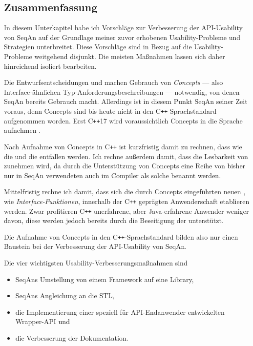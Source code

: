 \subsection{Zusammenfassung}

In diesem Unterkapitel habe ich Vorschläge zur Verbesserung der API-Usability von SeqAn auf der Grundlage meiner zuvor erhobenen Usability-Probleme und Strategien unterbreitet. Diese Vorschläge sind in Bezug auf die Usability-Probleme weitgehend disjunkt. Die meisten Maßnahmen lassen sich daher hinreichend isoliert bearbeiten.

Die Entwurfsentscheidungen  und  machen Gebrauch von \textit{Concepts} --- also Interface-ähnlichen Typ-Anforderungsbeschreibungen --- notwendig, von denen SeqAn bereits Gebrauch macht. Allerdings ist in diesem Punkt SeqAn seiner Zeit voraus, denn Concepts sind bis heute nicht in den C\texttt{++}-Sprachstandard aufgenommen worden. Erst C\texttt{++}17 wird voraussichtlich Concepts in die Sprache aufnehmen \citep{Schmidt:2014tf}.

Nach Aufnahme von Concepts in C\texttt{++} ist kurzfristig damit zu rechnen, dass  wie die  und die  entfallen werden. Ich rechne außerdem damit, dass die Lesbarkeit von  zunehmen wird, da durch die Unterstützung von Concepts eine Reihe von bisher nur in SeqAn verwendeten  auch im Compiler als solche benannt werden.

Mittelfristig rechne ich damit, dass sich die durch Concepts eingeführten neuen , wie \textit{Interface-Funktionen}, innerhalb der C\texttt{++} geprägten Anwenderschaft etablieren werden. Zwar profitieren C\texttt{++} unerfahrene, aber Java-erfahrene Anwender weniger davon, diese werden jedoch bereits durch die Beseitigung der  unterstützt.

Die Aufnahme von Concepts in den C\texttt{++}-Sprachstandard bilden also nur einen Baustein bei der Verbesserung der API-Usability von SeqAn.

Die vier wichtigsten Usability-Verbesserungsmaßnahmen sind \begin{itemize}
\itemsep1pt\parskip0pt
  \item SeqAns Umstellung von einem Framework auf eine Library,
  \item SeqAns Angleichung an die STL,
  \item die Implementierung einer speziell für API-Endanwender entwickelten Wrapper-API und
  \item die Verbesserung der Dokumentation.
\end{itemize}

